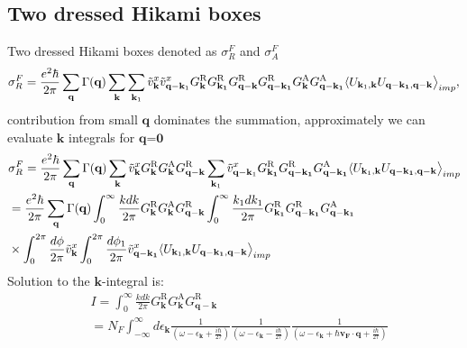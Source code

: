 \documentclass[aps,prb,amsmath,amssymb,footinbib,showpacs,twocolumn]{revtex4-2}
\begin{document}
\begin{widetext}
\subsection{ Two dressed Hikami boxes}
Two dressed Hikami boxes denoted as $\sigma_{R}^{F}$ and $\sigma_{A}^{F}$
\begin{multline}
    \sigma_{R}^{F}= \frac{e^{2}\hbar}{2\pi}\sum_{\textbf{q}}\Gamma(\textbf{q})\sum_{\textbf{k}}\sum_{\textbf{k}_{1}}\Tilde v_{\textbf{k}}^{x}\Tilde v^{x}_{\textbf{q}-\textbf{k}_{1}}G_{\mathbf{k}}^{\mathrm{R}}G_{\mathbf{k_1}}^{\mathrm{R}}G_{\mathbf{q-k}}^{\mathrm{R}} G_{\mathbf{q-k_1}}^{\mathrm{R}}G_{\mathbf{k}}^{\mathrm{A}} G_{\mathbf{q-k_1}}^{\mathrm{A}}\langle U_{\mathbf{k}_{1},\textbf{k}}U_{\mathbf{q-k_{1}},\mathbf{q-k}}\bigl \rangle_{imp},
\end{multline}
contribution from small $\mathbf{q}$ dominates the summation, approximately we can evaluate $\mathbf{k}$ integrals for $\textbf{q=0}$
\begin{align}
  &\sigma_{R}^{F}= \frac{e^{2}\hbar}{2\pi}\sum_{\textbf{q}}\Gamma(\textbf{q})\sum_{\textbf{k}}\Tilde v_{\textbf{k}}^{x} G_{\mathbf{k}}^{\mathrm{R}} G_{\mathbf{k}}^{\mathrm{A}}G_{\mathbf{q-k}}^{\mathrm{R}}\sum_{\textbf{k}_{1}}\Tilde v^{x}_{\textbf{q}-\textbf{k}_{1}}G_{\mathbf{k_1}}^{\mathrm{R}}G_{\mathbf{q-k_1}}^{\mathrm{R}} G_{\mathbf{q-k_1}}^{\mathrm{A}}\langle U_{\mathbf{k}_{1},\textbf{k}}U_{\mathbf{q-k_{1}},\mathbf{q-k}}\bigl \rangle_{imp}\nonumber\\
  &= \frac{e^{2}\hbar}{2\pi}\sum_{\textbf{q}}\Gamma(\textbf{q})\int_{0}^{\infty}\frac{kdk}{2\pi}G_{\mathbf{k}}^{\mathrm{R}} G_{\mathbf{k}}^{\mathrm{A}}G_{\mathbf{q-k}}^{\mathrm{R}}\int_{0}^{\infty}\frac{k_{1}dk_{1}}{2\pi}G_{\mathbf{k_1}}^{\mathrm{R}}G_{\mathbf{q-k_1}}^{\mathrm{R}} G_{\mathbf{q-k_1}}^{\mathrm{A}}\nonumber \\ &\times\int_{0}^{2\pi}\frac{d\phi}{2\pi}\Tilde v_{\textbf{k}}^{x}\int_{0}^{2\pi}\frac{d\phi_{1}}{2\pi}\Tilde v_{\mathbf{q-k_{1}}}^{x}\langle U_{\mathbf{k}_{1},\textbf{k}}U_{\mathbf{q-k_{1}},\mathbf{q-k}}\bigl \rangle_{imp}
\end{align}
Solution to the $\mathbf{k}$-integral is:
\begin{align}
     &I = \int_{0}^{\infty}\frac{kdk}{2\pi}G_{\mathbf{k}}^{\mathrm{R}} G_{\mathbf{k}}^{\mathrm{A}}G_{\mathbf{q-k}}^{\mathrm{R}} \nonumber \\
     &= N_{F}\int_{-\infty}^{\infty}d\epsilon_{\mathbf{k}} \frac{1}{(\omega-\epsilon_{\mathbf{k}}+\frac{i\hbar}{2\tau})}\frac{1}{(\omega-\epsilon_{\mathbf{k}}-\frac{i\hbar}{2\tau})}\frac{1}{(\omega-\epsilon_{\mathbf{k}}+\hbar\mathbf{v_{F} \cdot q}+\frac{i\hbar}{2\tau})}

\end{align}
\end{widetext}
\end{document}
